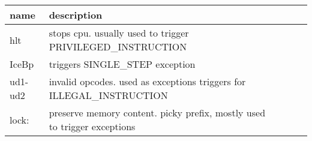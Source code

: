\newpage
\begin{tabular}{lllll}
\toprule
name & description \\
\midrule
hlt & stops cpu. usually used to trigger PRIVILEGED\_INSTRUCTION\\
IceBp & triggers SINGLE\_STEP exception\\
ud1-ud2 & invalid opcodes. used as exceptions triggers for ILLEGAL\_INSTRUCTION \\
lock: & preserve memory content. picky prefix, mostly used to trigger exceptions\\
\bottomrule
\end{tabular}


\sig

